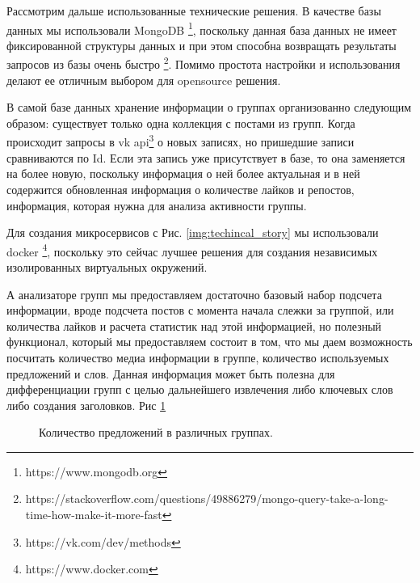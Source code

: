 \documentclass[14pt]{matmex-diploma-custom}
\begin{document}
Рассмотрим дальше использованные технические решения. В качестве базы данных мы использовали MongoDB \footnote{https://www.mongodb.org}, поскольку данная база данных не имеет фиксированной структуры данных и при этом способна возвращать результаты запросов из базы очень быстро \footnote{https://stackoverflow.com/questions/49886279/mongo-query-take-a-long-time-how-make-it-more-fast}. Помимо простота настройки и использования делают ее отличным выбором для opensource решения.

В самой базе данных хранение информации о группах организованно следующим образом: существует только одна коллекция с постами из групп. Когда происходит запросы в vk api\footnote{https://vk.com/dev/methods} о новых записях, но пришедшие записи сравниваются по Id. Если эта запись уже присутствует в базе, то она заменяется на более новую, поскольку информация о ней более актуальная и в ней содержится обновленная информация о количестве лайков и репостов, информация, которая нужна для анализа активности группы.

Для создания микросервисов с Рис. \ref{img:techincal_story} мы использовали docker \footnote{https://www.docker.com}, поскольку это сейчас лучшее решения для создания независимых изолированных виртуальных окружений.

А анализаторе групп мы предоставляем достаточно базовый набор подсчета информации, вроде подсчета постов с момента начала слежки за группой, или количества лайков и расчета статистик над этой информацией, но полезный функционал, который мы предоставляем состоит в том, что мы даем возможность посчитать количество медиа информации в группе, количество используемых предложений и слов. Данная информация может быть полезна для дифференциации групп с целью дальнейшего извлечения либо ключевых слов либо создания заголовков. Рис \ref{img:sentence_counts}

\begin{figure}[ht]
\begin{center}


\caption{
\label{img:sentence_counts} Количество предложений в различных группах.
        }
\end {center}
\end {figure}
\end{document}
